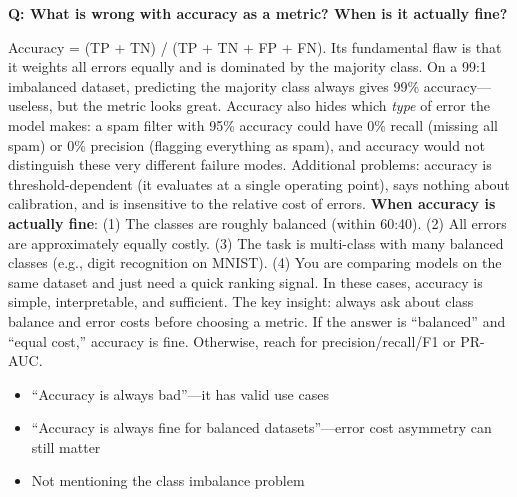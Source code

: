 \begin{interviewq}
\end{interviewq}

\begin{interviewq}
\textbf{Q: What is wrong with accuracy as a metric? When is it actually fine?}

 \quad {} \quad \badgefreq{\freqhigh}

\stronganswer Accuracy = (TP + TN) / (TP + TN + FP + FN). Its fundamental flaw is that it weights all errors equally and is dominated by the majority class. On a 99:1 imbalanced dataset, predicting the majority class always gives 99\% accuracy---useless, but the metric looks great. Accuracy also hides which \textit{type} of error the model makes: a spam filter with 95\% accuracy could have 0\% recall (missing all spam) or 0\% precision (flagging everything as spam), and accuracy would not distinguish these very different failure modes. Additional problems: accuracy is threshold-dependent (it evaluates at a single operating point), says nothing about calibration, and is insensitive to the relative cost of errors. \textbf{When accuracy is actually fine}: (1) The classes are roughly balanced (within 60:40). (2) All errors are approximately equally costly. (3) The task is multi-class with many balanced classes (e.g., digit recognition on MNIST). (4) You are comparing models on the same dataset and just need a quick ranking signal. In these cases, accuracy is simple, interpretable, and sufficient. The key insight: always ask about class balance and error costs before choosing a metric. If the answer is ``balanced'' and ``equal cost,'' accuracy is fine. Otherwise, reach for precision/recall/F1 or PR-AUC.

\redflags
\begin{itemize}
    \item ``Accuracy is always bad''---it has valid use cases
    \item ``Accuracy is always fine for balanced datasets''---error cost asymmetry can still matter
    \item Not mentioning the class imbalance problem
\end{itemize}



\end{interviewq}
